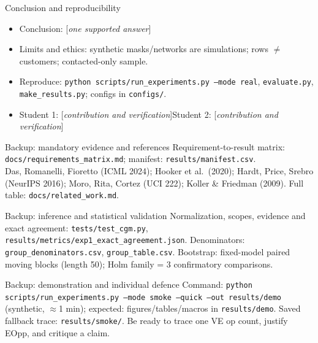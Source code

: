 \documentclass[aspectratio=169,11pt]{beamer}
\newcommand{\fillin}[1]{[\textit{#1}]}
\begin{document}
\begin{frame}{Conclusion and reproducibility}
\begin{itemize}
\item Conclusion: \fillin{one supported answer}
\item Limits and ethics: synthetic masks/networks are simulations; rows $\neq$ customers; contacted-only sample.
\item Reproduce: \texttt{python scripts/run\_experiments.py --mode real}, \texttt{evaluate.py}, \texttt{make\_results.py}; configs in \texttt{configs/}.
\item Student 1: \fillin{contribution and verification}\quad Student 2: \fillin{contribution and verification}
\end{itemize}
\end{frame}
\appendix
\begin{frame}{Backup: mandatory evidence and references}
\small Requirement-to-result matrix: \texttt{docs/requirements\_matrix.md}; manifest: \texttt{results/manifest.csv}.\\
Das, Romanelli, Fioretto (ICML 2024); Hooker et al.\ (2020); Hardt, Price, Srebro (NeurIPS 2016); Moro, Rita, Cortez (UCI 222); Koller \& Friedman (2009). Full table: \texttt{docs/related\_work.md}.
\end{frame}
\begin{frame}{Backup: inference and statistical validation}
\small Normalization, scopes, evidence and exact agreement: \texttt{tests/test\_cgm.py}, \texttt{results/metrics/exp1\_exact\_agreement.json}. Denominators: \texttt{group\_denominators.csv}, \texttt{group\_table.csv}. Bootstrap: fixed-model paired moving blocks (length 50); Holm family = 3 confirmatory comparisons.
\end{frame}
\begin{frame}{Backup: demonstration and individual defence}
\small Command: \texttt{python scripts/run\_experiments.py --mode smoke --quick --out results/demo} (synthetic, $\approx$1 min); expected: figures/tables/macros in \texttt{results/demo}. Saved fallback trace: \texttt{results/smoke/}. Be ready to trace one VE op count, justify EOpp, and critique a claim.
\end{frame}
\end{document}
